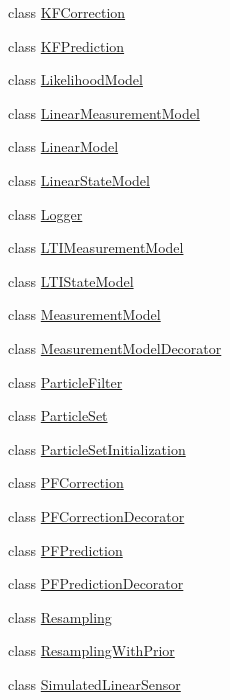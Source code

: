 \begin{DoxyCompactItemize}
\item 
class \mbox{\hyperlink{classbfl_1_1KFCorrection}{K\+F\+Correction}}
\item 
class \mbox{\hyperlink{classbfl_1_1KFPrediction}{K\+F\+Prediction}}
\item 
class \mbox{\hyperlink{classbfl_1_1LikelihoodModel}{Likelihood\+Model}}
\item 
class \mbox{\hyperlink{classbfl_1_1LinearMeasurementModel}{Linear\+Measurement\+Model}}
\item 
class \mbox{\hyperlink{classbfl_1_1LinearModel}{Linear\+Model}}
\item 
class \mbox{\hyperlink{classbfl_1_1LinearStateModel}{Linear\+State\+Model}}
\item 
class \mbox{\hyperlink{classbfl_1_1Logger}{Logger}}
\item 
class \mbox{\hyperlink{classbfl_1_1LTIMeasurementModel}{L\+T\+I\+Measurement\+Model}}
\item 
class \mbox{\hyperlink{classbfl_1_1LTIStateModel}{L\+T\+I\+State\+Model}}
\item 
class \mbox{\hyperlink{classbfl_1_1MeasurementModel}{Measurement\+Model}}
\item 
class \mbox{\hyperlink{classbfl_1_1MeasurementModelDecorator}{Measurement\+Model\+Decorator}}
\item 
class \mbox{\hyperlink{classbfl_1_1ParticleFilter}{Particle\+Filter}}
\item 
class \mbox{\hyperlink{classbfl_1_1ParticleSet}{Particle\+Set}}
\item 
class \mbox{\hyperlink{classbfl_1_1ParticleSetInitialization}{Particle\+Set\+Initialization}}
\item 
class \mbox{\hyperlink{classbfl_1_1PFCorrection}{P\+F\+Correction}}
\item 
class \mbox{\hyperlink{classbfl_1_1PFCorrectionDecorator}{P\+F\+Correction\+Decorator}}
\item 
class \mbox{\hyperlink{classbfl_1_1PFPrediction}{P\+F\+Prediction}}
\item 
class \mbox{\hyperlink{classbfl_1_1PFPredictionDecorator}{P\+F\+Prediction\+Decorator}}
\item 
class \mbox{\hyperlink{classbfl_1_1Resampling}{Resampling}}
\item 
class \mbox{\hyperlink{classbfl_1_1ResamplingWithPrior}{Resampling\+With\+Prior}}
\item 
class \mbox{\hyperlink{classbfl_1_1SimulatedLinearSensor}{Simulated\+Linear\+Sensor}}
\item 

\end{DoxyCompactItemize}
